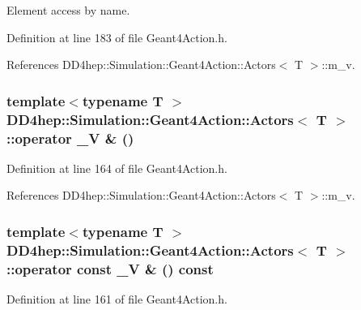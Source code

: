 Element access by name. 

Definition at line 183 of file Geant4Action.h.

References DD4hep::Simulation::Geant4Action::Actors$<$ T $>$::m\_\-v.\hypertarget{class_d_d4hep_1_1_simulation_1_1_geant4_action_1_1_actors_add6d146b0484877366303b2a7dd7435f}{
\subsubsection[{operator \_\-V \&}]{\setlength{\rightskip}{0pt plus 5cm}template$<$typename T $>$ {\bf DD4hep::Simulation::Geant4Action::Actors}$<$ {\bf T} $>$::operator {\bf \_\-V} \& ()}}
\label{class_d_d4hep_1_1_simulation_1_1_geant4_action_1_1_actors_add6d146b0484877366303b2a7dd7435f}


Definition at line 164 of file Geant4Action.h.

References DD4hep::Simulation::Geant4Action::Actors$<$ T $>$::m\_\-v.\hypertarget{class_d_d4hep_1_1_simulation_1_1_geant4_action_1_1_actors_afcd9da6e3de33b39daceccca1522f0e8}{
\subsubsection[{operator const \_\-V \&}]{\setlength{\rightskip}{0pt plus 5cm}template$<$typename T $>$ {\bf DD4hep::Simulation::Geant4Action::Actors}$<$ {\bf T} $>$::operator const {\bf \_\-V} \& () const}}
\label{class_d_d4hep_1_1_simulation_1_1_geant4_action_1_1_actors_afcd9da6e3de33b39daceccca1522f0e8}


Definition at line 161 of file Geant4Action.h.

